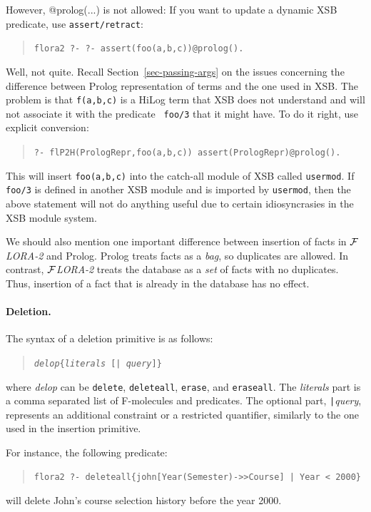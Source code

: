 \documentclass[11pt]{article}
\newcommand{\FLORA}{{\mbox{${\cal F}${\small\it LORA}\rm\emph{-2}}}\xspace}
\begin{document}
However, @prolog(...) is not allowed: If you want to update a dynamic XSB
predicate, use {\tt assert/retract}:
\begin{quote}
 {\tt flora2 ?- ?- assert(foo(a,b,c))@prolog().  }
\end{quote}
Well, not quite. Recall Section~\ref{sec-passing-args} on the issues
concerning the difference between Prolog representation of terms and the
one used in XSB. The problem is that {\tt f(a,b,c)} is a HiLog term that
XSB does not understand and will not associate it with the predicate {\tt
  foo/3}  that it might have. To do it right, use explicit conversion:
\begin{quote}
 {\tt ?- flP2H(PrologRepr,foo(a,b,c)) assert(PrologRepr)@prolog().  }
\end{quote}
This will insert {\tt foo(a,b,c)} into the catch-all module of XSB called
{\tt usermod}. If {\tt foo/3} is defined in another XSB module and is
imported by {\tt usermod}, then the above statement will not do anything
useful due to certain idiosyncrasies in the XSB module system.

We should also mention one important difference between insertion of facts
in \FLORA and Prolog. Prolog treats facts as a \emph{bag}, so duplicates
are allowed. In contrast, \FLORA treats the database as a \emph{set} of
facts with no duplicates. Thus, insertion of a fact that is already in the
database has no effect.


%
\paragraph{Deletion.} The syntax of a deletion primitive is as follows:
\begin{quote}
{\tt \emph{delop}\{\emph{literals} [| \emph{query}]\}}
\end{quote}
where {\it delop} can be {\tt delete}, {\tt deleteall}, {\tt erase}, and
{\tt eraseall}. The {\it literals} part is a comma separated list of
F-molecules and predicates. The optional part, {\tt |}\emph{query},
represents an additional constraint or a restricted quantifier, similarly
to the one used in the insertion primitive.

For instance, the following predicate:
\begin{quote}
\begin{verbatim}
flora2 ?- deleteall{john[Year(Semester)->>Course] | Year < 2000}
\end{verbatim}
\end{quote}
will delete John's course selection history before the year 2000.
\end{document}
